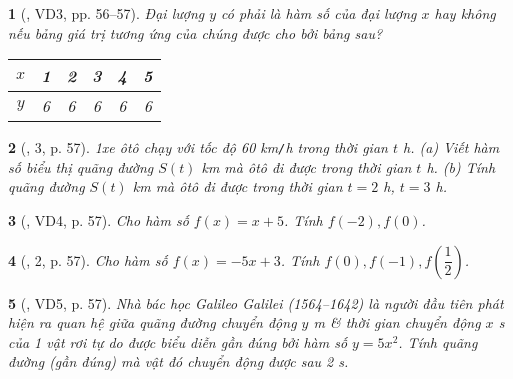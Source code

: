 \documentclass{article}
\newtheorem{baitoan}{}
\begin{document}
\begin{baitoan}[\cite{SGK_Toan_8_Canh_Dieu_tap_1}, VD3, pp. 56--57]
	Đại lượng $y$ có phải là hàm số của đại lượng $x$ hay không nếu bảng giá trị tương ứng của chúng được cho bởi bảng sau?
	\begin{table}[H]
		\centering
		\begin{tabular}{|c|c|c|c|c|c|}
			\hline
			$x$ & 1 & 2 & 3 & 4 & 5 \\
			\hline
			$y$ & 6 & 6 & 6 & 6 & 6 \\
			\hline
		\end{tabular}
	\end{table}
\end{baitoan}

\begin{baitoan}[\cite{SGK_Toan_8_Canh_Dieu_tap_1}, 3, p. 57]
	1xe ôtô chạy với tốc độ {\rm60 km{\tt/}h} trong thời gian $t$ {\rm h}. (a) Viết hàm số biểu thị quãng đường $S(t)$ {\rm km} mà ôtô đi được trong thời gian $t$ {\rm h}. (b) Tính quãng đường $S(t)$ {\rm km} mà ôtô đi được trong thời gian $t = 2$ {\rm h}, $t = 3$ {\rm h}.
\end{baitoan}

\begin{baitoan}[\cite{SGK_Toan_8_Canh_Dieu_tap_1}, VD4, p. 57]
	Cho hàm số $f(x) = x + 5$. Tính $f(-2),f(0)$.
\end{baitoan}

\begin{baitoan}[\cite{SGK_Toan_8_Canh_Dieu_tap_1}, 2, p. 57]
	Cho hàm số $f(x) = -5x + 3$. Tính $f(0),f(-1),f\left(\dfrac{1}{2}\right)$.
\end{baitoan}

\begin{baitoan}[\cite{SGK_Toan_8_Canh_Dieu_tap_1}, VD5, p. 57]
	Nhà bác học Galileo Galilei (1564--1642) là người đầu tiên phát hiện ra quan hệ giữa quãng đường chuyển động $y$ {\rm m} \& thời gian chuyển động $x$ {\rm s} của 1 vật rơi tự do được biểu diễn gần đúng bởi hàm số $y = 5x^2$. Tính quãng đường (gần đúng) mà vật đó chuyển động được sau {\rm2 s}.
\end{baitoan}
\end{document}
